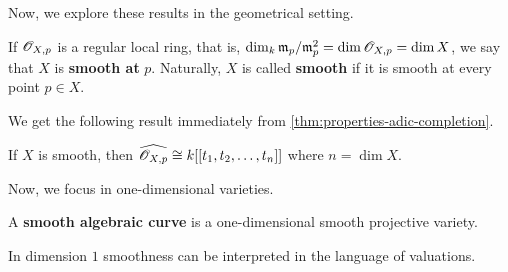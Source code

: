 Now, we explore these results in the geometrical setting. 
\begin{definition}\label{def:}
	If ${\mathscr O}_{X,p}$ is a regular local ring, that is, $\dim_{k} \mathfrak{m}_{p}/\mathfrak{m}_{p}^{2} = \dim {\mathscr O}_{X,p} = \dim X$, we say that $X$ is \textbf{smooth at} $p$. Naturally, $X$ is called \textbf{smooth} if it is smooth at every point $p\in X$.
\end{definition}
We get the following result immediately from \cref{thm:properties-adic-completion}.
\begin{corollary}\label{cor:smooth-iff-isomorphic-to-power-series}
	If $X$ is smooth, then $\widehat{{\mathscr O}_{X,p}} \cong k[[t_{1}, t_{2}, \ldots, t_{n}]]$ where $n = \dim X$.
\end{corollary}
Now, we focus in one-dimensional varieties.
\begin{definition}\label{def:algebraic-curve}
	A \textbf{smooth algebraic curve} is a one-dimensional smooth projective variety.
\end{definition}
In dimension $1$ smoothness can be interpreted in the language of valuations.
